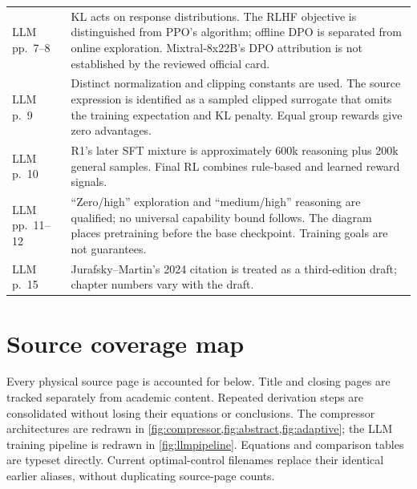 \documentclass[11pt,a4paper]{article}
\numberwithin{equation}{section}
\numberwithin{figure}{section}
\numberwithin{table}{section}
\begin{document}
\begin{longtable}{@{}P{33mm}P{116mm}@{}}
LLM pp.\ 7--8 & KL acts on response distributions. The RLHF objective is distinguished from PPO's algorithm; offline DPO is separated from online exploration. Mixtral-8x22B's DPO attribution is not established by the reviewed official card.\\\addlinespace
LLM p.\ 9 & Distinct normalization and clipping constants are used. The source expression is identified as a sampled clipped surrogate that omits the training expectation and KL penalty. Equal group rewards give zero advantages.\\\addlinespace
LLM p.\ 10 & R1's later SFT mixture is approximately 600k reasoning plus 200k general samples. Final RL combines rule-based and learned reward signals.\\\addlinespace
LLM pp.\ 11--12 & ``Zero/high'' exploration and ``medium/high'' reasoning are qualified; no universal capability bound follows. The diagram places pretraining before the base checkpoint. Training goals are not guarantees.\\\addlinespace
LLM p.\ 15 & Jurafsky--Martin's 2024 citation is treated as a third-edition draft; chapter numbers vary with the draft.\\\bottomrule
\end{longtable}

\section{Source coverage map}\label{app:coverage}
Every physical source page is accounted for below. Title and closing pages are tracked separately from academic content. Repeated derivation steps are consolidated without losing their equations or conclusions. The compressor architectures are redrawn in \cref{fig:compressor,fig:abstract,fig:adaptive}; the LLM training pipeline is redrawn in \cref{fig:llmpipeline}. Equations and comparison tables are typeset directly. Current optimal-control filenames replace their identical earlier aliases, without duplicating source-page counts.
\end{document}
